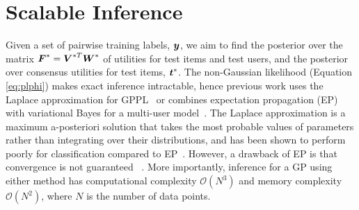 \section{Scalable Inference}\label{sec:inf}

Given a set of pairwise training labels, $\boldsymbol y$,
we aim to find the posterior over the matrix
$\boldsymbol F^*=\boldsymbol V^{*T} \boldsymbol W^*$ of utilities for test items and test users,
and the posterior over consensus utilities for test items, $\boldsymbol t^*$.
The non-Gaussian likelihood (Equation \ref{eq:plphi})
makes exact inference intractable, hence previous work uses
 the Laplace approximation for GPPL~\citep{chu2005preference}
or combines expectation propagation (EP) with variational Bayes for a 
multi-user model~\citep{houlsby2012collaborative}.
The Laplace approximation is a maximum a-posteriori solution that
takes the most probable values of parameters rather than integrating over their distributions,
and has been shown to perform poorly for classification compared to EP~\citep{nickisch2008approximations}. 
However, 
a drawback of EP is that convergence is not guaranteed
~\citep{minka2001expectation}.
More importantly, inference for a GP using either method
has computational complexity $\mathcal{O}(N^3)$ 
and memory complexity $\mathcal{O}(N^2)$, where $N$ is the number of data points.

